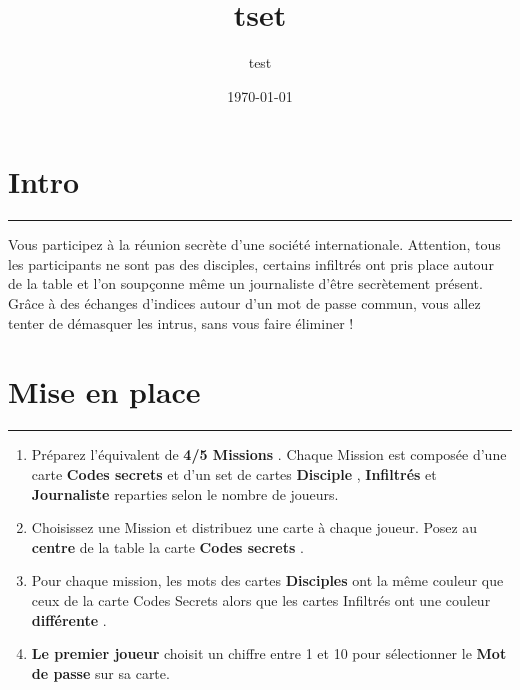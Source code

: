 \documentclass{article}%
\title{tset}%
\author{test}%
\date{\today}%
\begin{document}
%
\normalsize%
\maketitle\thispagestyle{header}%
\pagestyle{header}%
\sectionfont{\color{blue}}%
\subsectionfont{\color{blue}}%
\subsubsectionfont{\color{blue}}%
\section{ Intro
}%
\label{sec:Intro}%
\textcolor{blue}{\rule{18cm}{0.07cm}}\break%
Vous participez à la réunion secrète d'une société internationale. Attention, tous les participants ne sont pas des disciples, certains infiltrés ont pris place autour de la table et l'on soupçonne même un journaliste d'être secrètement présent. Grâce à des échanges d'indices autour d'un mot de passe commun, vous allez tenter de démasquer les intrus, sans vous faire éliminer !


%
\sectionfont{\color{mygreen}}%
\subsectionfont{\color{mygreen}}%
\subsubsectionfont{\color{mygreen}}%
\section{ Mise en place
}%
\label{sec:Miseenplace}%
\textcolor{mygreen}{\rule{18cm}{0.07cm}}\break%
\begin{enumerate}%
\item%
%
 Préparez l'équivalent de %
\textcolor{mygreen}{%
\textbf{4/5 Missions}%
}%
. Chaque Mission est composée d'une carte %
\textcolor{mygreen}{%
\textbf{Codes secrets}%
}%
\textit{ }%
 et d'un set de cartes %
\textcolor{mygreen}{%
\textbf{Disciple}%
}%
,%
\textcolor{mygreen}{%
\textbf{ Infiltrés}%
}%
\textit{ }%
 et %
\textcolor{mygreen}{%
\textbf{Journaliste}%
}%
\textit{ }%
 reparties selon le nombre de joueurs.
%
\item%
%
 Choisissez une Mission et distribuez une carte à chaque joueur. Posez au %
\textcolor{mygreen}{%
\textbf{centre}%
}%
\textit{ }%
 de la table la carte %
\textcolor{mygreen}{%
\textbf{Codes secrets}%
}%
.
%
\item%
%
 Pour chaque mission, les mots des cartes %
\textcolor{mygreen}{%
\textbf{Disciples}%
}%
\textit{ }%
 ont la même couleur que ceux de la carte Codes Secrets alors que les cartes Infiltrés ont une couleur %
\textcolor{mygreen}{%
\textbf{différente}%
}%
.
%
\item%
%
\textcolor{mygreen}{%
\textbf{Le premier joueur}%
}%
\textit{ }%
 choisit un chiffre entre 1 et 10 pour sélectionner le %
\textcolor{mygreen}{%
\textbf{Mot de passe}%
}%
\textit{ }%
 sur sa carte.
%
\end{enumerate}
\end{document}
